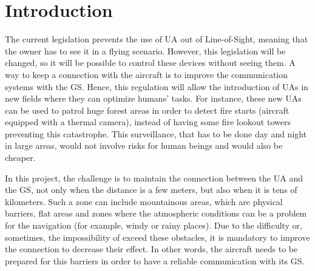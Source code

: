 \chapter{Introduction}\label{ch:intro}

The current legislation prevents the use of UA out of Line-of-Sight, meaning that the owner has to see it in a flying scenario. However, this legislation will be changed, so it will be possible to control these devices without seeing them. A way to keep a connection with the aircraft is to improve the communication systems with the GS. Hence, this regulation will allow the introduction of UAs in new fields where they can optimize humans' tasks. For instance, these new UAs can be used to patrol huge forest areas in order to detect fire starts (aircraft equipped with a thermal camera), instead of having some fire lookout towers preventing this catastrophe. This surveillance, that has to be done day and night in large areas, would not involve risks for human beings and would also be cheaper. 




In this project, the challenge is to maintain the connection between the UA and the GS, not only when the distance is a few meters, but also when it is tens of kilometers. Such a zone can include mountainous areas, which are physical barriers, flat areas and zones where the atmospheric conditions can be a problem for the navigation (for example, windy or rainy places). Due to the difficulty or, sometimes, the impossibility of exceed these obstacles, it is mandatory to improve the connection to decrease their effect. In other words, the aircraft needs to be prepared for this barriers in order to have a reliable communication with its GS. 

